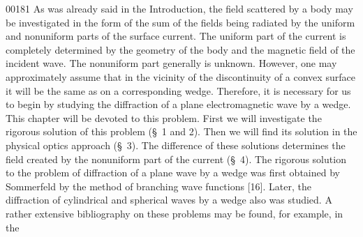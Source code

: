 \begin{scanpage}{0018}{1}
As was already said in the Introduction, the field scattered by a body may be investigated in the form of the sum of the fields being radiated by the uniform and nonuniform parts of the surface current. The uniform part of the current is completely determined by the geometry of the body and the magnetic field of the incident wave. The nonuniform part generally is unknown. However, one may approximately assume that in the vicinity of the discontinuity of a convex surface it will be the same as on a corresponding wedge. Therefore, it is necessary for us to begin by studying the diffraction of a plane electromagnetic wave by a wedge. This chapter will be devoted to this problem. First we will investigate the rigorous solution of this problem (\S\ 1 and 2). Then we will find its solution in the physical optics approach (\S\ 3). The difference of these solutions determines the field created by the nonuniform part of the current (\S\ 4).
The rigorous solution to the problem of diffraction of a plane wave by a wedge was first obtained by Sommerfeld by the method of branching wave functions [16]. Later, the diffraction of cylindrical and spherical waves by a wedge also was studied. A rather extensive bibliography on these problems may be found, for example, in the
\end{scanpage}
